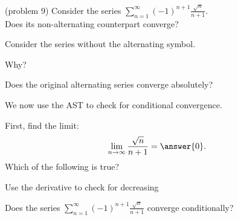 \documentclass{ximera}
\begin{document}
\begin{problem}(problem 9)
Consider the series $\displaystyle{\sum_{n=1}^\infty (-1)^{n+1} \frac{\sqrt n}{n + 1}}$.\\
Does its non-alternating counterpart converge?
\begin{hint} 
Consider the series without the alternating symbol.
\end{hint}
\begin{multipleChoice}
\end{multipleChoice}

Why?
\begin{multipleChoice}
\end{multipleChoice}




Does the original alternating series converge absolutely?
\begin{multipleChoice}
\end{multipleChoice}

We now use the AST to check for conditional convergence.

First, find the limit:
\[
\lim_{n\to\infty} \frac{\sqrt n}{n + 1} = \answer{0}.
\]
Which of the following is true? 
\begin{hint}
Use the derivative to check for decreasing
\end{hint}
\begin{multipleChoice}
\end{multipleChoice}


Does the series $\displaystyle{\sum_{n=1}^\infty (-1)^{n+1} \frac{\sqrt n}{n + 1}}$ converge conditionally?
\begin{multipleChoice}
\end{multipleChoice}

\end{problem}
\end{document}
